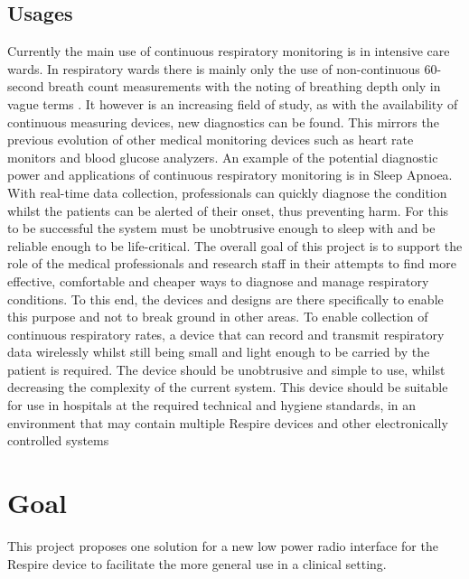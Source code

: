 \subsection{Usages}
Currently the main use of continuous respiratory monitoring is in intensive
care wards. In respiratory wards there is mainly only the use of non-continuous
60-second breath count measurements with the noting of breathing depth only in vague
terms \cite{Hunter2008}. It however is an increasing field of study, as with the availability of continuous measuring
devices, new diagnostics can be found. This mirrors the previous evolution of other medical
monitoring devices such as heart rate monitors and blood glucose analyzers.
An example of the potential diagnostic power and applications of continuous respiratory
monitoring is in Sleep Apnoea. With real-time data collection, professionals can quickly diagnose the
condition whilst the patients can be alerted of their onset, thus preventing harm\cite{5334605}.
For this to be successful the system must be unobtrusive enough to
sleep with and be reliable enough to be life-critical.
The overall goal of this project is to support the role of the medical
professionals and research staff in their attempts to find more
effective, comfortable and cheaper ways to diagnose and manage
respiratory conditions. To this end, the devices and designs are there specifically to enable this
purpose and not to break ground in other areas.
To enable collection of continuous respiratory rates, a device that can record and transmit
respiratory data wirelessly whilst still being small and light enough to be carried by the patient is
required. The device should be unobtrusive and simple to use, whilst decreasing the complexity of
the current system. This device should be suitable for use in hospitals at the required technical and
hygiene standards, in an environment that may contain multiple Respire devices and other
electronically controlled systems

\section{Goal}
This project proposes one solution for a new low power radio interface for the Respire device to
facilitate the more general use in a clinical setting.


